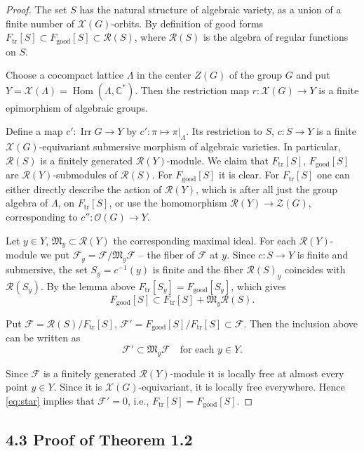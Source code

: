 \documentclass[12pt,a4paper]{article}
\theoremstyle{plain}
\theoremstyle{definition}
\theoremstyle{remark}
\DeclareMathOperator{\Irr}{Irr}
\DeclareMathOperator{\tr}{tr}
\DeclareMathOperator{\Hom}{Hom}
\newcommand{\cO}{\mathcal{O}}
\newcommand{\cR}{\mathcal{R}}
\newcommand{\cZ}{\mathcal{Z}}
\newcommand{\cF}{\mathcal{F}}
\newcommand{\cX}{\mathcal{X}}
\newcommand{\fM}{\mathfrak{M}}
\newcommand{\bC}{\mathbb{C}}
\begin{document}
\begin{proof}
The set $S$ has the natural structure of algebraic variety, as a union of a finite number of $\cX(G)$-orbits. By definition of good forms $F_{\tr}[S] \subset F_{\text{good}}[S] \subset \cR(S)$, where $\cR(S)$ is the algebra of regular functions on $S$.

Choose a cocompact lattice $\Lambda$ in the center $Z(G)$ of the group $G$ and put $Y = \cX(\Lambda) = \Hom(\Lambda, \bC^*)$. Then the restriction map $r: \cX(G) \to Y$ is a finite epimorphism of algebraic groups.

Define a map $c': \Irr G \to Y$ by $c': \pi \mapsto \pi|_\Lambda$. Its restriction to $S$, $c: S \to Y$ is a finite $\cX(G)$-equivariant submersive morphism of algebraic varieties. In particular, $\cR(S)$ is a finitely generated $\cR(Y)$-module. We claim that $F_{\tr}[S]$, $F_{\text{good}}[S]$ are $\cR(Y)$-submodules of $\cR(S)$. For $F_{\text{good}}[S]$ it is clear. For $F_{\tr}[S]$ one can either directly describe the action of $\cR(Y)$, which is after all just the group algebra of $\Lambda$, on $F_{\tr}[S]$, or use the homomorphism $\cR(Y) \to \cZ(G)$, corresponding to $c'': \cO(G) \to Y$.

Let $y \in Y$, $\fM_y \subset \cR(Y)$ the corresponding maximal ideal. For each $\cR(Y)$-module we put $\cF_y = \cF/\fM_y \cF$ -- the fiber of $\cF$ at $y$. Since $c: S \to Y$ is finite and submersive, the set $S_y = c^{-1}(y)$ is finite and the fiber $\cR(S)_y$ coincides with $\cR(S_y)$. By the lemma above $F_{\tr}[S_y] = F_{\text{good}}[S_y]$, which gives
\[
F_{\text{good}}[S] \subset F_{\tr}[S] + \fM_y \cR(S).
\]

Put $\cF = \cR(S)/F_{\tr}[S]$, $\cF' = F_{\text{good}}[S]/F_{\tr}[S] \subset \cF$. Then the inclusion above can be written as
\begin{equation}\label{eq:star}
\cF' \subset \fM_y \cF \quad \text{for each } y \in Y. \tag{*}
\end{equation}

Since $\cF$ is a finitely generated $\cR(Y)$-module it is locally free at almost every point $y \in Y$. Since it is $\cX(G)$-equivariant, it is locally free everywhere. Hence \eqref{eq:star} implies that $\cF' = 0$, i.e., $F_{\tr}[S] = F_{\text{good}}[S]$.
\end{proof}

\subsection*{4.3 Proof of Theorem 1.2}
\end{document}
